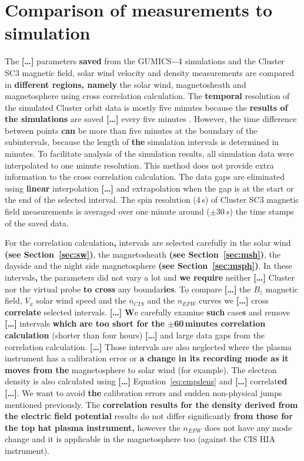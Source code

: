 \documentclass[linenumbers,draft]{agujournal}
\begin{document}
\section{Comparison of measurements to simulation}
\label{sec:comp}

The \textbf{[\dots]} parameters \textbf{saved} from the GUMICS$-$4 simulations and the Cluster SC3 magnetic field, solar wind velocity and density measurements are compared in \textbf{different regions, namely} the solar wind, magnetosheath and magnetosphere using cross correlation calculation. The \textbf{temporal} resolution of the simulated Cluster orbit data is mostly five minutes because the \textbf{results of the simulations} are saved \textbf{[\dots]} every five minutes \citep{facsko16:_one_earth}. However, the time difference between points \textbf{can} be more than five minutes at the boundary of the subintervals, because the length of \textbf{the} simulation intervals is determined in minutes. To facilitate analysis of the simulation results, all simulation data were interpolated to one minute resolution. This method does not provide extra information to the cross correlation calculation. The data gaps are eliminated using \textbf{linear} interpolation \textbf{[\dots]} and extrapolation when the gap is at the start or the end of the selected interval. The spin resolution (4\,s) of Cluster SC3 magnetic field measurements is averaged over one minute around ($\pm30\,s$) the time stamps of the saved data. 

For the correlation calculation\textbf{,} intervals are selected carefully in the solar wind \textbf{(see Section~\ref{sec:sw})}, the magnetosheath \textbf{(see Section~\ref{sec:msh})}, the dayside and the night side magnetosphere \textbf{(see Section~\ref{sec:msph})}. In these intervals\textbf{,} the parameters did not vary a lot and \textbf{we require} neither \textbf{[\dots]} Cluster nor the virtual probe \textbf{to cross} any boundar\textbf{ies}. To compare \textbf{[\dots]} the $B_z$ magnetic field, $V_x$ solar wind speed and the $n_{CIS}$ and the $n_{EFW}$ curves we \textbf{[\dots]} cross \textbf{correlate} selected intervals. \textbf{[\dots]} \textbf{W}e carefully examine \textbf{such} case\textbf{s} and remove \textbf{[\dots]} intervals \textbf{which are too short for the $\pm$60\,minutes correlation calculation} (shorter than four hours) \textbf{[\dots]} and large data gaps from the correlation calculation. \textbf{[\dots]} Those intervals are also neglected where the plasma instrument has a calibration error or \textbf{a change in its recording mode as it moves from the} magnetosphere to solar wind (for example). The electron density is also calculated using \textbf{[\dots]} Equation~\ref{eq:empdens} and \textbf{[\dots]} correlat\textbf{ed [\dots]}. We want to avoid \textbf{the} calibration errors and sudden non-physical jumps mentioned previously. The \textbf{correlation results for the density derived from the electric field potential} results do not differ significantly \textbf{from those for the top hat plasma instrument,} however the $n_{EFW}$ does not have any mode change and it is applicable in the magnetosphere too (against the CIS HIA instrument).
\end{document}
